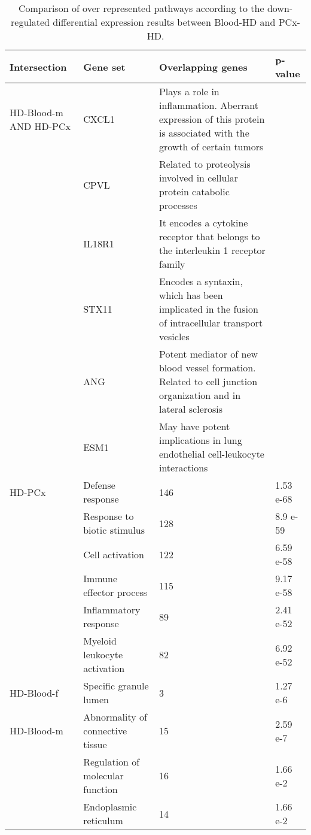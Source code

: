 \begin{table}[!ht]
\centering
\caption{Comparison of over represented pathways according to the down-regulated differential expression results between Blood-HD and PCx-HD.}
\begin{tabularx}{1.0\textwidth}{L{2cm}L{2.5cm}L{8cm}C{1.5cm}}
\toprule
\textbf{Intersection} & \textbf{Gene set} & \textbf{Overlapping genes} & \textbf{p-value} \\
\midrule
HD-Blood-m AND HD-PCx &
  CXCL1 &
  Plays a role in inflammation. Aberrant expression of this protein is associated with the growth of certain tumors &\\
 &
  CPVL &
  Related to proteolysis involved in cellular protein catabolic processes &\\
 &
  IL18R1 &
  It encodes a cytokine receptor that belongs to the interleukin 1 receptor family &\\
 &
  STX11 &
  Encodes a syntaxin, which has been implicated in the fusion of intracellular transport vesicles &\\
 &
  ANG &
  Potent mediator of new blood vessel formation. Related to cell junction organization and in lateral sclerosis &\\
 &
  ESM1 &
  May have potent implications in   lung endothelial cell-leukocyte interactions & \\
HD-PCx &
  Defense response &
  146 &
  1.53 e-68 \\
 &
  Response to biotic stimulus &
  128 &
  8.9 e-59 \\
 &
  Cell activation &
  122 &
  6.59 e-58 \\
 &
  Immune effector process &
  115 &
  9.17 e-58 \\
 &
  Inflammatory response &
  89 &
  2.41 e-52 \\
 &
  Myeloid leukocyte activation &
  82 &
  6.92 e-52 \\
HD-Blood-f &
  Specific granule lumen &
  3 &
  1.27 e-6 \\
HD-Blood-m &
  Abnormality of connective tissue &
  15 &
  2.59 e-7 \\
\ &
  Regulation of molecular function &
  16 &
  1.66 e-2 \\
 &
  Endoplasmic reticulum &
  14 &
  1.66 e-2 \\
\bottomrule
\end{tabularx}
\end{table}


